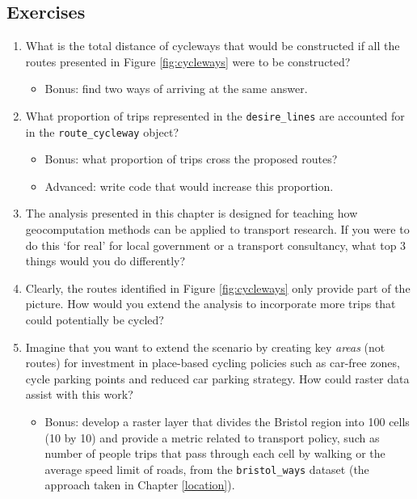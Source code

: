 \documentclass[]{krantz}
\providecommand{\tightlist}{%
  \setlength{\itemsep}{0pt}\setlength{\parskip}{0pt}}
\begin{document}
\hypertarget{ex-transport}{%
\subsection{Exercises}\label{ex-transport}}

\begin{enumerate}
\def\labelenumi{\arabic{enumi}.}
\tightlist
\item
  What is the total distance of cycleways that would be constructed if all the routes presented in Figure \ref{fig:cycleways} were to be constructed?

  \begin{itemize}
  \tightlist
  \item
    Bonus: find two ways of arriving at the same answer.
  \end{itemize}
\item
  What proportion of trips represented in the \texttt{desire\_lines} are accounted for in the \texttt{route\_cycleway} object?

  \begin{itemize}
  \tightlist
  \item
    Bonus: what proportion of trips cross the proposed routes?
  \item
    Advanced: write code that would increase this proportion.
  \end{itemize}
\item
  The analysis presented in this chapter is designed for teaching how geocomputation methods can be applied to transport research. If you were to do this `for real' for local government or a transport consultancy, what top 3 things would you do differently?
\item
  Clearly, the routes identified in Figure \ref{fig:cycleways} only provide part of the picture. How would you extend the analysis to incorporate more trips that could potentially be cycled?
\item
  Imagine that you want to extend the scenario by creating key \emph{areas} (not routes) for investment in place-based cycling policies such as car-free zones, cycle parking points and reduced car parking strategy. How could raster data assist with this work?

  \begin{itemize}
  \tightlist
  \item
    Bonus: develop a raster layer that divides the Bristol region into 100 cells (10 by 10) and provide a metric related to transport policy, such as number of people trips that pass through each cell by walking or the average speed limit of roads, from the \texttt{bristol\_ways} dataset (the approach taken in Chapter \ref{location}).
  \end{itemize}
\end{enumerate}
\end{document}
